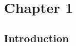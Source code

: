 \chapter[Chapter 1]{Chapter 1 \label{ch:chapter1}}
\let\thefootnote\relax{}

%
%

\section{Introduction}

\cite{dummy-citation}




\setcounter{section}{0}%
\renewcommand\thesection{\thechapter.\Alph{section}}



\renewcommand\thesection{\thechapter.\arabic{section}}
